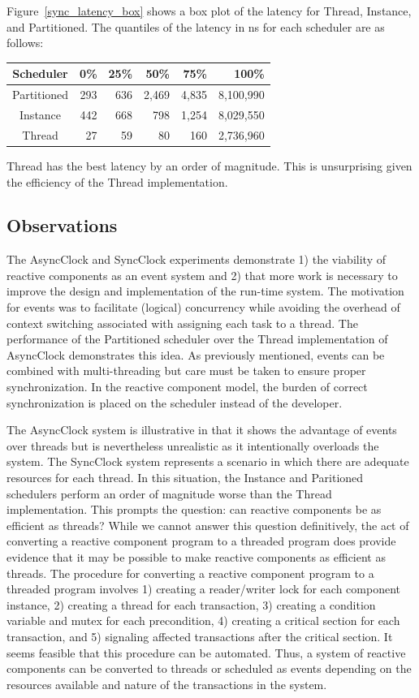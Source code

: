 Figure~\ref{sync_latency_box} shows a box plot of the latency for Thread, Instance, and Partitioned.
The quantiles of the latency in ns for each scheduler are as follows:
\begin{center}
\begin{tabular}{crrrrr}
Scheduler &       0\%  &    25\%  &    50\%  &    75\%  &   100\% \\
\hline
Partitioned & 293 &   636 & 2,469 & 4,835 &  8,100,990 \\
Instance    & 442 &   668 &   798 & 1,254 &  8,029,550 \\
Thread      &  27 &    59 &    80 &   160 &  2,736,960 \\
\end{tabular}
\end{center}
Thread has the best latency by an order of magnitude.
This is unsurprising given the efficiency of the Thread implementation.

\subsection{Observations}

The AsyncClock and SyncClock experiments demonstrate 1) the viability of reactive components as an event system and 2) that more work is necessary to improve the design and implementation of the run-time system.
The motivation for events was to facilitate (logical) concurrency while avoiding the overhead of context switching associated with assigning each task to a thread.
The performance of the Partitioned scheduler over the Thread implementation of AsyncClock demonstrates this idea.
As previously mentioned, events can be combined with multi-threading but care must be taken to ensure proper synchronization.
In the reactive component model, the burden of correct synchronization is placed on the scheduler instead of the developer.

The AsyncClock system is illustrative in that it shows the advantage of events over threads but is nevertheless unrealistic as it intentionally overloads the system.
The SyncClock system represents a scenario in which there are adequate resources for each thread.
In this situation, the Instance and Paritioned schedulers perform an order of magnitude worse than the Thread implementation.
This prompts the question:  can reactive components be as efficient as threads?
While we cannot answer this question definitively, the act of converting a reactive component program to a threaded program does provide evidence that it may be possible to make reactive components as efficient as threads.
The procedure for converting a reactive component program to a threaded program involves 1) creating a reader/writer lock for each component instance, 2) creating a thread for each transaction, 3) creating a condition variable and mutex for each precondition, 4) creating a critical section for each transaction, and 5) signaling affected transactions after the critical section.
It seems feasible that this procedure can be automated.
Thus, a system of reactive components can be converted to threads or scheduled as events depending on the resources available and nature of the transactions in the system.

